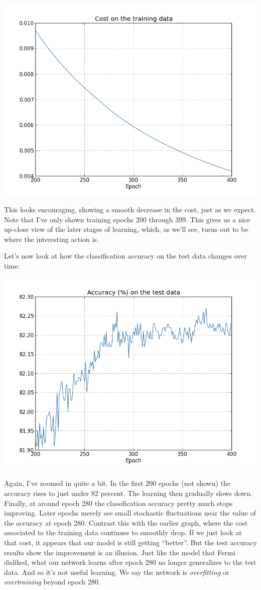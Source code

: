 \documentclass[a4paper,twoside,10pt]{book}
\begin{document}
\begin{center}
	\includegraphics[width=0.6\linewidth]{figures/ch3/overfitting1}
\end{center}
This looks encouraging, showing a smooth decrease in the cost, just as we expect. Note that I've only shown training epochs 200 through 399. This gives us a nice up-close view of the later stages of learning, which, as we'll see, turns out to be where the interesting action is.

Let's now look at how the classification accuracy on the test data changes over time:
\begin{center}
	\includegraphics[width=0.6\linewidth]{figures/ch3/overfitting2}
\end{center}
Again, I've zoomed in quite a bit. In the first 200 epochs (not shown) the accuracy rises to just under 82 percent. The learning then gradually slows down. Finally, at around epoch 280 the classification accuracy pretty much stops improving. Later epochs merely see small stochastic fluctuations near the value of the accuracy at epoch 280. Contrast this with the earlier graph, where the cost associated to the training data continues to smoothly drop. If we just look at that cost, it appears that our model is still getting ``better''. But the test accuracy results show the improvement is an illusion. Just like the model that Fermi disliked, what our network learns after epoch 280 no longer generalizes to the test data. And so it's not useful learning. We say the network is \textit{overfitting} or \textit{overtraining} beyond epoch 280.
\end{document}
